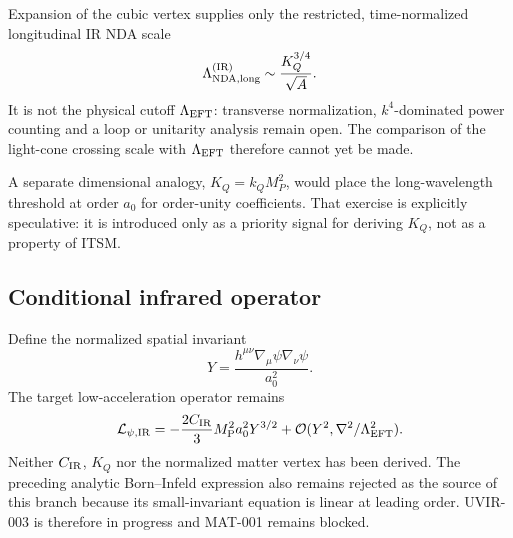Expansion of the cubic vertex supplies only the restricted, time-normalized
longitudinal IR NDA scale
\begin{equation}
 \Lambda_{\rm NDA,long}^{\rm (IR)}\sim\frac{K_Q^{3/4}}{\sqrt A}.
 \label{eq:long-nda}
\end{equation}
It is not the physical cutoff $\Lambda_{\rm EFT}$: transverse normalization,
$k^4$-dominated power counting and a loop or unitarity analysis remain open.
The comparison of the light-cone crossing scale with $\Lambda_{\rm EFT}$
therefore cannot yet be made.

A separate dimensional analogy, $K_Q=k_QM_P^2$, would place the
long-wavelength threshold at order $a_0$ for order-unity coefficients.  That
exercise is explicitly speculative: it is introduced only as a priority
signal for deriving $K_Q$, not as a property of ITSM.

\subsection{Conditional infrared operator}

Define the normalized spatial invariant
\begin{equation}
 Y=\frac{h^{\mu\nu}\nabla_\mu\psi\nabla_\nu\psi}{a_0^2}.
 \label{eq:Y}
\end{equation}
The target low-acceleration operator remains
\begin{equation}
 \mathcal L_{\psi,\rm IR}
 =-\frac{2C_{\rm IR}}{3}M_{\mathrm P}^2a_0^2Y^{3/2}
 +\mathcal O(Y^2,\nabla^2/\Lambda_{\rm EFT}^2).
 \label{eq:ir-action}
\end{equation}
Neither $C_{\rm IR}$, $K_Q$ nor the normalized matter vertex has been derived.
The preceding analytic Born--Infeld expression also remains rejected as the
source of this branch because its small-invariant equation is linear at
leading order.  UVIR-003 is therefore in progress and MAT-001 remains blocked.
